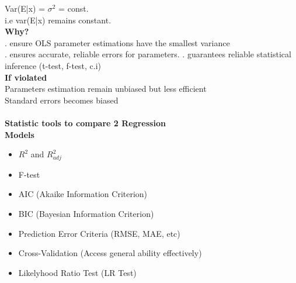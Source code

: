\documentclass{article}
\begin{document}
\indent \indent \indent Var(E|x) = $\sigma^2$ = const.\\
\indent \indent \indent \indent i.e var(E|x) remains constant.\\
\indent \indent \textbf{Why?}\\
\indent \indent {}. ensure OLS parameter estimations have the smallest variance\\
\indent \indent {}. ensures accurate, reliable errors for parameters.
\indent \indent {}. guarantees reliable statistical inference (t-test, f-test, c.i)\\
\indent \indent \textbf{If violated}\\
\indent \indent \indent * Parameters estimation remain unbiased but less efficient\\
\indent \indent \indent * Standard errors becomes biased\\
\\
\textbf{Statistic tools to compare 2 Regression}\\
\textbf{Models}\\
\begin{itemize}
    \setlength\itemsep{0em}
    \item $R^2$ and $R^2_{adj}$
    \item F-test
    \item AIC (Akaike Information Criterion)
    \item BIC (Bayesian Information Criterion)
    \item Prediction Error Criteria (RMSE, MAE, etc)
    \item Cross-Validation (Access general ability effectively)
    \item Likelyhood Ratio Test (LR Test)
\end{itemize}
\end{document}
